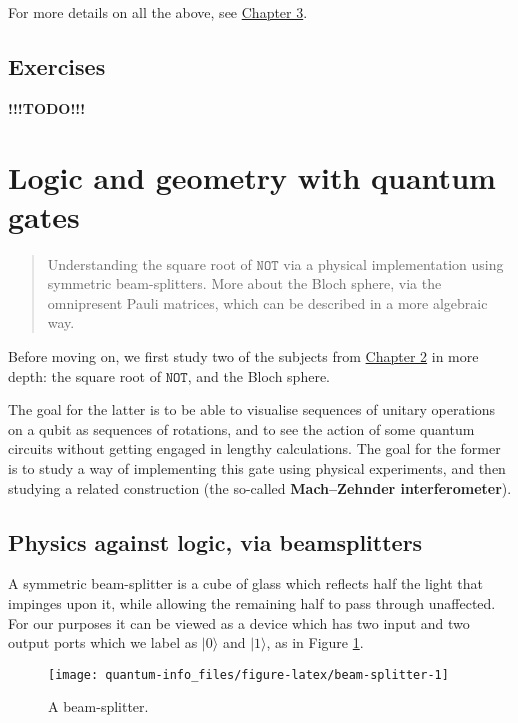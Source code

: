 \documentclass{article}
\begin{document}
For more details on all the above, see \protect\hyperlink{chapter3}{Chapter 3}.

\hypertarget{exercises}{%
\subsection{Exercises}\label{exercises}}

\textbf{!!!TODO!!!}

\hypertarget{chapter3}{%
\section{Logic and geometry with quantum gates}\label{chapter3}}

\begin{quote}
Understanding the square root of \(\texttt{NOT}\) via a physical implementation using symmetric beam-splitters.
More about the Bloch sphere, via the omnipresent Pauli matrices, which can be described in a more algebraic way.
\end{quote}

Before moving on, we first study two of the subjects from \protect\hyperlink{chapter2}{Chapter 2} in more depth: the square root of \(\texttt{NOT}\), and the Bloch sphere.

The goal for the latter is to be able to visualise sequences of unitary operations on a qubit as sequences of rotations, and to see the action of some quantum circuits without getting engaged in lengthy calculations.
The goal for the former is to study a way of implementing this gate using physical experiments, and then studying a related construction (the so-called \textbf{Mach--Zehnder interferometer}).

\hypertarget{physics-against-logic-via-beamsplitters}{%
\subsection{Physics against logic, via beamsplitters}\label{physics-against-logic-via-beamsplitters}}

A symmetric beam-splitter is a cube of glass which reflects half the light that impinges upon it, while allowing the remaining half to pass through unaffected.
For our purposes it can be viewed as a device which has two input and two output ports which we label as \(|0\rangle\) and \(|1\rangle\), as in Figure \ref{fig:beam-splitter}.

\begin{figure}[H]

{\centering \texttt{[image: quantum-info\_files/figure-latex/beam-splitter-1]} 

}

\caption{A beam-splitter.}\label{fig:beam-splitter}
\end{figure}
\end{document}
